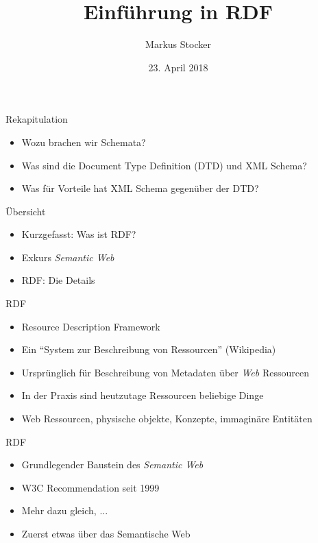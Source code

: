 \documentclass{beamer}
\title{Einführung in RDF}
\author{Markus Stocker}
\date{23. April 2018}
\begin{document}
\maketitle

\begin{frame}{Rekapitulation}
	
	\begin{itemize}
		\item Wozu brachen wir Schemata?
		\item Was sind die Document Type Definition (DTD) und XML Schema?
		\item Was für Vorteile hat XML Schema gegenüber der DTD?
	\end{itemize}
	
\end{frame}

\begin{frame}{Übersicht}
	
	\begin{itemize}
		\item Kurzgefasst: Was ist RDF?
		\item Exkurs \emph{Semantic Web}
		\item RDF: Die Details
	\end{itemize}
	
\end{frame}

\begin{frame}{RDF}
	
	\begin{itemize}
		\item Resource Description Framework
		\item Ein ``System zur Beschreibung von Ressourcen'' (Wikipedia)
		\item Ursprünglich für Beschreibung von Metadaten über \emph{Web} Ressourcen
		\item In der Praxis sind heutzutage Ressourcen beliebige Dinge
		\item Web Ressourcen, physische objekte, Konzepte, immaginäre Entitäten
	\end{itemize}
	
\end{frame}

\begin{frame}{RDF}
	
	\begin{itemize}
		\item Grundlegender Baustein des \emph{Semantic Web}
		\item W3C Recommendation seit 1999
		\item Mehr dazu gleich, ...
		\item Zuerst etwas über das Semantische Web
	\end{itemize}
	
\end{frame}
\end{document}
